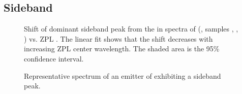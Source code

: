 


	\subsection{Sideband} \label{subsubsec::sideband}

		\begin{figure}[tp]
			\centering
			\caption{Shift of dominant sideband peak from the \ZPL in spectra of \sivs (\vl, samples \insituF, \insituS, \insituH) vs. ZPL \cwl. The linear fit shows that the shift decreases with increasing ZPL center wavelength. The shaded area is the 95\% confidence interval.}
			\label{fig::sideband_fit}
		\end{figure}

		\begin{figure}[tp]
			\centering
			\caption{Representative spectrum of an emitter of \vl exhibiting a sideband peak.}
			\label{fig::broad_peak_sb}
		\end{figure}

